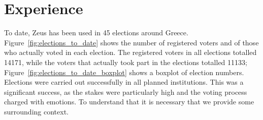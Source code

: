\documentclass[letterpaper,10pt]{article}
\begin{document}







\section{Experience}
\label{sec:experience}

To date, Zeus has been used in 45 elections around Greece.
Figure~\ref{fig:elections_to_date} shows the number of registered
voters and of those who actually voted in each election. The
registered voters in all elections totalled 14171, while the voters
that actually took part in the elections totalled 11133;
Figure~\ref{fig:elections_to_date_boxplot} shows a boxplot of
election numbers. Elections were carried out successfully in all
planned institutions. This was a significant success, as the stakes
were particularly high and the voting process charged with emotions.
To understand that it is necessary that we provide some surrounding
context.
\end{document}
